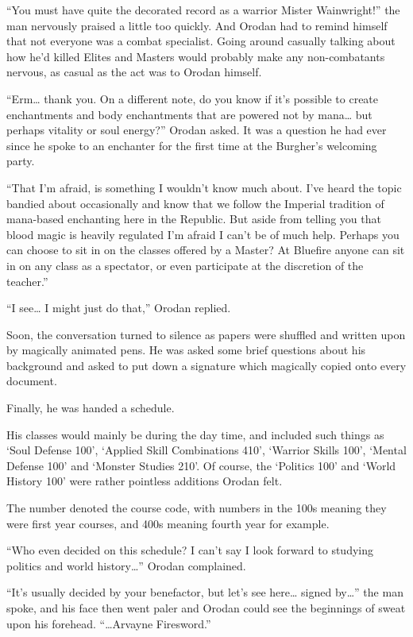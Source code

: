 \documentclass[a4paper,10pt]{book}
\begin{document}
“You must have quite the decorated record as a warrior Mister Wainwright!” the man nervously praised a little too quickly. And Orodan had to remind himself that not everyone was a combat specialist. Going around casually talking about how he’d killed Elites and Masters would probably make any non-combatants nervous, as casual as the act was to Orodan himself.\par
“Erm… thank you. On a different note, do you know if it’s possible to create enchantments and body enchantments that are powered not by mana… but perhaps vitality or soul energy?” Orodan asked. It was a question he had ever since he spoke to an enchanter for the first time at the Burgher’s welcoming party.\par
“That I’m afraid, is something I wouldn’t know much about. I’ve heard the topic bandied about occasionally and know that we follow the Imperial tradition of mana-based enchanting here in the Republic. But aside from telling you that blood magic is heavily regulated I’m afraid I can’t be of much help. Perhaps you can choose to sit in on the classes offered by a Master? At Bluefire anyone can sit in on any class as a spectator, or even participate at the discretion of the teacher.”\par
“I see… I might just do that,” Orodan replied.\par
Soon, the conversation turned to silence as papers were shuffled and written upon by magically animated pens. He was asked some brief questions about his background and asked to put down a signature which magically copied onto every document.\par
Finally, he was handed a schedule.\par
His classes would mainly be during the day time, and included such things as ‘Soul Defense 100’, ‘Applied Skill Combinations 410’, ‘Warrior Skills 100’, ‘Mental Defense 100’ and ‘Monster Studies 210’. Of course, the ‘Politics 100’ and ‘World History 100’ were rather pointless additions Orodan felt.\par
The number denoted the course code, with numbers in the 100s meaning they were first year courses, and 400s meaning fourth year for example.\par
“Who even decided on this schedule? I can’t say I look forward to studying politics and world history…” Orodan complained.\par
“It’s usually decided by your benefactor, but let’s see here… signed by…” the man spoke, and his face then went paler and Orodan could see the beginnings of sweat upon his forehead. “…Arvayne Firesword.”\par
\end{document}
